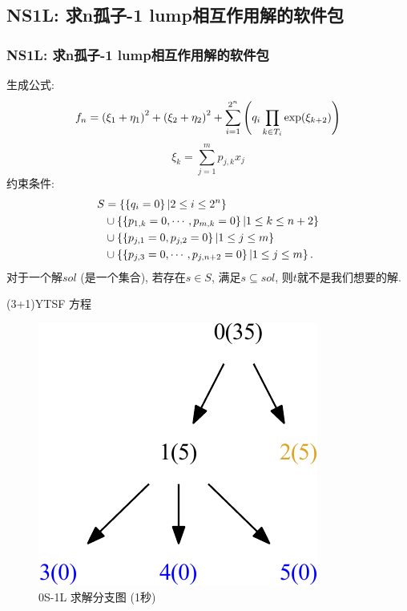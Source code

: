 \subsection{NS1L: 求n孤子-1 lump相互作用解的软件包}
\begin{frame}
\frametitle{NS1L: 求n孤子-1 lump相互作用解的软件包}
生成公式:
\[
    f_n=\left(\xi_1+\eta_1\right)^2+\left(\xi_2+\eta_2\right)^2+\sum_{i=1}^{2^n}\left(q_i\prod_{k \in T_i}{\exp(\xi_{k+2})}\right)
\]
\[
    \xi_k=\sum_{j=1}^m{p_{j,k}x_j}
\]
约束条件:
\[
\begin{aligned}
    S&=\left\{\left\{q_i=0\right\}|2\le i \le 2^n\right\} \\ 
        &\cup \left\{\left\{p_{1,k}=0,\cdots,p_{m,k}=0\right\}|1\le k \le n+2\right\}  \\
        &\cup \left\{\left\{p_{j,1}=0,p_{j,2}=0\right\}|1\le j \le m\right\} \\ 
        &\cup \left\{\left\{p_{j,3}=0,\cdots,p_{j,n+2}=0\right\}|1\le j \le m\right\} . 
\end{aligned}
\]
对于一个解$sol$ (是一个集合), 若存在$s\in S$, 满足$s\subseteq sol$, 则$t$就不是我们想要的解.
\end{frame}

\begin{frame}
(3+1)YTSF 方程
\begin{figure}
\centering
\includegraphics[width=.5\textwidth]{../paper/fig/0S1L.pdf}
\caption{0S-1L 求解分支图 (1秒)}
\end{figure}
\end{frame}

